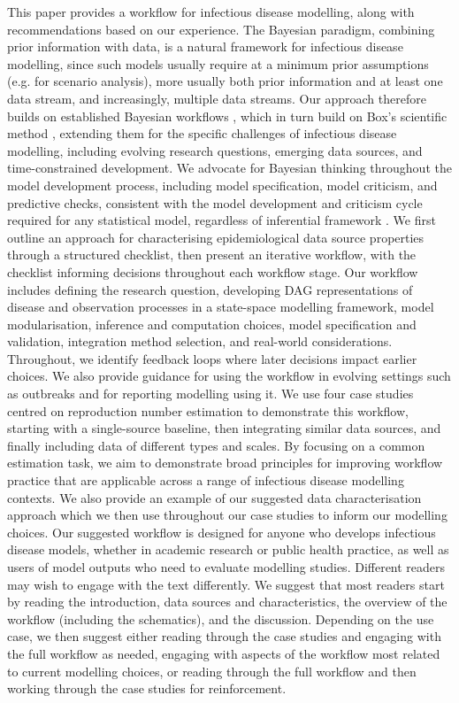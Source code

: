 \documentclass{article}
\begin{document}
This paper provides a workflow for infectious disease modelling, along with recommendations based on our experience.
The Bayesian paradigm, combining prior information with data, is a natural framework for infectious disease modelling, since such models usually require at a minimum prior assumptions (e.g. for scenario analysis), more usually both prior information and at least one data stream, and increasingly, multiple data streams. Our approach therefore builds on established Bayesian workflows \citep{green2003highly,gelman2020bayesian}, which in turn build on Box's scientific method \citep{box1979robustness,Box1980}, extending them for the specific challenges of infectious disease modelling, including evolving research questions, emerging data sources, and time-constrained development.
We advocate for Bayesian thinking throughout the model development process, including model specification, model criticism, and predictive checks, consistent with the model development and criticism cycle required for any statistical model, regardless of inferential framework \citep{box1979robustness}.
We first outline an approach for characterising epidemiological data source properties through a structured checklist, then present an iterative workflow, with the checklist informing decisions throughout each workflow stage.
Our workflow includes defining the research question, developing \ac{DAG} representations of disease and observation processes in a state-space modelling framework, model modularisation, inference and computation choices, model specification and validation, integration method selection, and real-world considerations.
Throughout, we identify feedback loops where later decisions impact earlier choices.
We also provide guidance for using the workflow in evolving settings such as outbreaks and for reporting modelling using it.
We use four case studies centred on reproduction number estimation to demonstrate this workflow, starting with a single-source baseline, then integrating similar data sources, and finally including data of different types and scales.
By focusing on a common estimation task, we aim to demonstrate broad principles for improving workflow practice that are applicable across a range of infectious disease modelling contexts.
We also provide an example of our suggested data characterisation approach which we then use throughout our case studies to inform our modelling choices.
Our suggested workflow is designed for anyone who develops infectious disease models, whether in academic research or public health practice, as well as users of model outputs who need to evaluate modelling studies. 
Different readers may wish to engage with the text differently.
We suggest that most readers start by reading the introduction, data sources and characteristics, the overview of the workflow (including the schematics), and the discussion.
Depending on the use case, we then suggest either reading through the case studies and engaging with the full workflow as needed, engaging with aspects of the workflow most related to current modelling choices, or reading through the full workflow and then working through the case studies for reinforcement.
\end{document}

